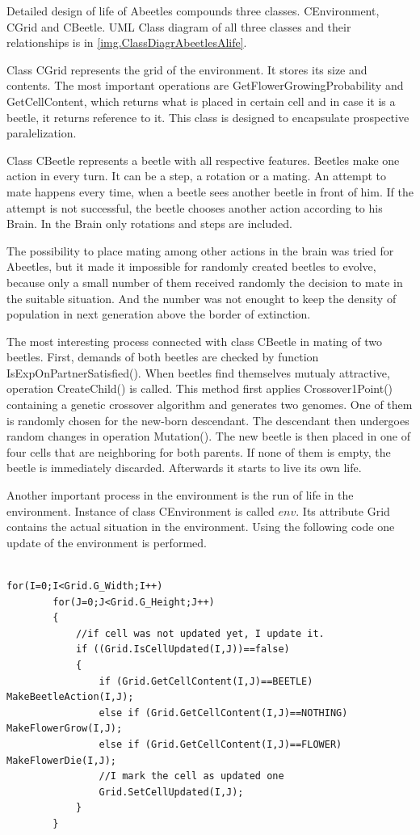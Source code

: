 \documentclass[a4paper,12pt]{report}
\begin{document}
Detailed design of life of Abeetles compounds three classes. CEnvironment, CGrid and CBeetle. UML Class diagram of all three classes and their relationships is in \ref{img.ClassDiagrAbeetlesAlife}. 

Class CGrid represents the grid of the environment. It stores its size and contents. The most important operations are GetFlowerGrowingProbability and GetCellContent, which returns what is placed in certain cell and in case it is a beetle, it returns reference to it. This class is designed to encapsulate prospective paralelization.

Class CBeetle represents a beetle with all respective features. Beetles make one action in every turn. It can be a step, a rotation or a mating. An attempt to mate happens every time, when a beetle sees another beetle in front of him. If the attempt is not successful, the beetle chooses another action according to his Brain. In the Brain only rotations and steps are included.

The possibility to place mating among other actions in the brain was tried for Abeetles, but it made it impossible for randomly created beetles to evolve, because only a small number of them received randomly the decision to mate in the suitable situation. And the number was not enought to keep the density of population in next generation above the border of extinction.

The most interesting process connected with class CBeetle in mating of two beetles. First, demands of both beetles are checked by function IsExpOnPartnerSatisfied(). When beetles find themselves mutualy attractive,  operation CreateChild() is called. This method first applies Crossover1Point() containing a genetic crossover algorithm and generates two genomes. One of them is randomly chosen for the new-born descendant. The descendant then undergoes random changes in operation Mutation(). The new beetle is then placed in one of four cells that are neighboring for both parents. If none of them is empty, the beetle is immediately discarded. Afterwards it starts to live its own life.

Another important process in the environment is the run of life in the environment. Instance of class CEnvironment is called $env$. Its attribute Grid   contains the actual situation in the environment. Using the following code one update of the environment is performed.

\begin{verbatim}

for(I=0;I<Grid.G_Width;I++)
		for(J=0;J<Grid.G_Height;J++)
		{
			//if cell was not updated yet, I update it.
			if ((Grid.IsCellUpdated(I,J))==false)
			{
				if (Grid.GetCellContent(I,J)==BEETLE) MakeBeetleAction(I,J);
				else if (Grid.GetCellContent(I,J)==NOTHING) MakeFlowerGrow(I,J);
				else if (Grid.GetCellContent(I,J)==FLOWER) MakeFlowerDie(I,J);
				//I mark the cell as updated one
				Grid.SetCellUpdated(I,J); 
			}
		}
		
\end{verbatim}		
\end{document}
